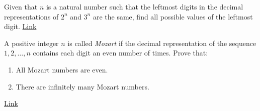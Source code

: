 \begin{problem}
	Given that $n$ is a natural number such that the leftmost digits in the decimal representations of $2^n$ and $3^n$ are the same, find all possible values of the leftmost digit. \hfill \href{http://artofproblemsolving.com/community/c6h1276412p6696449}{Link}
\end{problem}





\begin{problem}
	A positive integer $n$ is called \textit{Mozart} if the decimal representation of the sequence $1, 2, \ldots, n$ contains each digit an even number of times.
	Prove that:
	\begin{enumerate}
		\item All Mozart numbers are even.
		\item There are infinitely many Mozart numbers.
	\end{enumerate}
	\flushright \href{http://artofproblemsolving.com/community/c6h1295945p6876321}{Link}
\end{problem}

